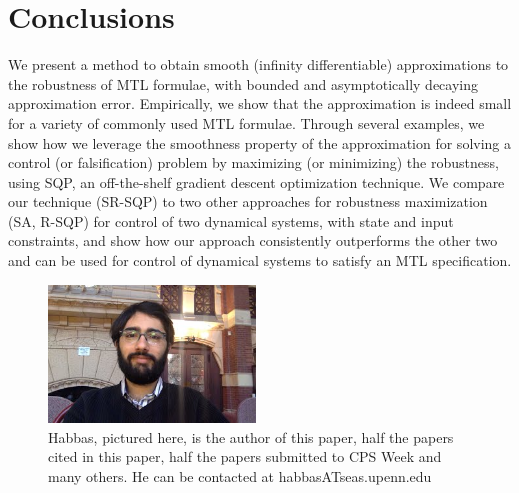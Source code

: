 \section{Conclusions}
We present a method to obtain smooth (infinity differentiable) approximations to the robustness of MTL formulae, with bounded and asymptotically decaying approximation error. 
Empirically, we show that the approximation is indeed small for a variety of commonly used MTL formulae. 
Through several examples, we show how we leverage the smoothness property of the approximation for solving a control (or falsification) problem by maximizing (or minimizing) the robustness, using SQP, an off-the-shelf gradient descent optimization technique. 
We compare our technique (SR-SQP) to two other approaches for robustness maximization (SA, R-SQP) for control of two dynamical systems, with state and input constraints, and show how our approach consistently outperforms the other two and can be used for control of dynamical systems to satisfy an MTL specification.

\begin{figure}[t]
\centering
\includegraphics[width=0.49\textwidth]{figures/Habbas}
\caption{{\small Habbas, pictured here, is the author of this paper, half the papers cited in this paper, half the papers submitted to CPS Week and many others. He can be contacted at habbasATseas.upenn.edu}}
\label{fig:quad_ssqp}
\end{figure}
